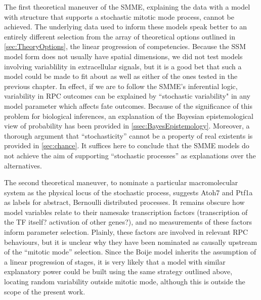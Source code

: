 The first theoretical maneuver of the SMME, explaining the data with a model with structure that supports a stochastic mitotic mode process, cannot be achieved. The underlying data used to inform these models speak better to an entirely different selection from the array of theoretical options outlined in \autoref{sec:TheoryOptions}, the linear progression of competencies. Because the SSM model form does not usually have spatial dimensions, we did not test models involving variablility in extracellular signals, but it is a good bet that such a model could be made to fit about as well as either of the ones tested in the previous chapter. In effect, if we are to follow the SMME's inferential logic, variability in RPC outcomes can be explained by ``stochastic variability" in any model parameter which affects fate outcomes. Because of the significance of this problem for biological inferences, an explanation of the Bayesian epistemological view of probability has been provided in \autoref{ssec:BayesEpistemology}. Moreover, a thorough argument that ``stochasticity'' cannot be a property of real existents is provided in \autoref{sec:chance}. It suffices here to conclude that the SMME models do not achieve the aim of supporting ``stochastic processes'' as explanations over the alternatives.

The second theoretical maneuver, to nominate a particular macromolecular system as the physical locus of the stochastic process, suggests Atoh7 and Ptf1a as labels for abstract, Bernoulli distributed processes. It remains obscure how model variables relate to their namesake transcription factors (transcription of the TF itself? activation of other genes?), and no measurements of these factors inform parameter selection. Plainly, these factors are involved in relevant RPC behaviours, but it is unclear why they have been nominated as causally upstream of the ``mitotic mode'' selection. Since the Boije model inherits the assumption of a linear progression of stages, it is very likely that a model with similar explanatory power could be built using the same strategy outlined above, locating random variability outside mitotic mode, although this is outside the scope of the present work.

